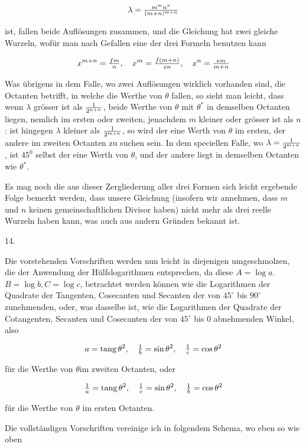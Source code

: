\documentclass[twoside,12pt, showframe]{memoir}
\let\oldfrac\frac
\def\frac#1#2{\mathchoice{\tfrac{#1}{#2}}{\oldfrac{#1}{#2}}{\genfrac{}{}{}{2}{#1}{#2\mathstrut}}{\genfrac{}{}{}{3}{#1}{#2\mathstrut}}}
\begin{document}
\[
\lambda=\frac{m^{m} n^{n}}{(m+n)^{m+n}}
\]

ist, fallen beide Auflösungen zusammen, und die Gleichung hat zwei gleiche Wurzeln, wofür man nach Gefallen eine der drei Formeln benutzen kann

\[
x^{m+n}=\frac{f m}{n}, \quad x^{m}=\frac{f(m+n)}{e n}, \quad x^{n}=\frac{e m}{m+n}
\]

Was übrigens in dem Falle, wo zwei Auflösungen wirklich vorhanden sind, die Octanten betrifft, in welche die Werthe von \(\theta\) fallen, so sieht man leicht, dass wenn \(\lambda\) grösser ist als \(\frac{1}{2^{n+n}}\), beide Werthe von \(\theta\) mit \(\theta^{*}\) in demselben Octanten liegen, nemlich im ersten oder zweiten, jenachdem \(m\) kleiner oder grösser ist als \(n\) : ist hingegen \(\lambda\) kleiner als \(\frac{1}{2^{m+n}}\), so wird der eine Werth von \(\theta\) im ersten, der andere im zweiten Octanten zu suchen sein. In dem speciellen Falle, wo \(\lambda=\frac{1}{2^{m+n}}\), ist \(45^{0}\) selbst der eine Werth von \(\theta\), und der andere liegt in demselben Octanten wie \(\theta^{*}\).

Es mag noch die aus dieser Zergliederung aller drei Formen sich leicht ergebende Folge bemerkt werden, dass unsere Gleichung (insofern wir annehmen, dass \(m\) und \(n\) keinen gemeinschaftlichen Divisor haben) nicht mehr als drei reelle Wurzeln haben kann, was auch aus andern Gründen bekannt ist.

14.

Die vorstehenden Vorschriften werden nun leicht in diejenigen umgeschmolzen, die der Anwendung der Hülfslogarithmen entsprechen, da diese \(A=\log a\). \(B=\log b, C=\log c\), betrachtet werden können wie die Logarithmen der Quadrate der Tangenten, Cosecanten und Secanten der von \(45^{\circ}\) bis \(90^{\circ}\) zunehmenden, oder, was dasselbe ist, wie die Logarithmen der Quadrate der Cotangenten, Secanten und Cosecanten der von \(45^{\circ}\) bis 0 abnehmenden Winkel, also

\[
a=\operatorname{tang} \theta^{2}, \quad \frac{1}{b}=\sin \theta^{2}, \quad \frac{1}{c}=\cos \theta^{2}
\]

für die Werthe von \(\theta \mathrm{im}\) zweiten Octanten, oder

\[
\frac{1}{a}=\operatorname{tang} \theta^{2}, \quad \frac{1}{c}=\sin \theta^{2}, \quad \frac{1}{b}=\cos \theta^{2}
\]

für die Werthe von \(\theta\) im ersten Octanten.

Die vollständigen Vorschriften vereinige ich in folgendem Schema, wo eben so wie oben
\end{document}
